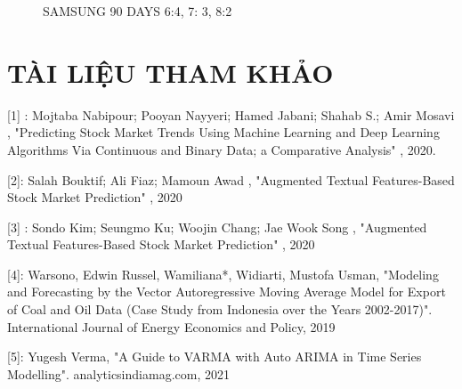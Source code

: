 \documentclass{article}
\begin{document}
\begin{multicols}{2}
\begin{figure}[H]
\begin{minipage}{0.15\textwidth}
    \label{fig:3}
    \end{minipage}
    \caption{SAMSUNG 90 DAYS  6:4, 7: 3, 8:2 }
\end{figure}


\section{TÀI LIỆU THAM KHẢO}


[1] : Mojtaba Nabipour; Pooyan Nayyeri; Hamed Jabani; Shahab S.; Amir Mosavi , "Predicting Stock Market Trends Using Machine Learning and Deep Learning Algorithms Via Continuous and Binary Data; a Comparative Analysis" , 2020. 

[2]: Salah Bouktif; Ali Fiaz; Mamoun Awad , "Augmented Textual Features-Based Stock Market Prediction" , 2020 

[3] : Sondo Kim; Seungmo Ku; Woojin Chang; Jae Wook Song , "Augmented Textual Features-Based Stock Market Prediction" , 2020 


[4]: Warsono, Edwin Russel, Wamiliana*, Widiarti, Mustofa Usman, "Modeling and Forecasting by the Vector Autoregressive Moving Average Model for Export of Coal and Oil Data (Case Study from Indonesia over the Years 2002-2017)". International Journal of Energy Economics and Policy, 2019

[5]: Yugesh Verma, "A Guide to VARMA with Auto ARIMA in Time Series Modelling". analyticsindiamag.com, 2021 




\end{multicols}
\end{document}
